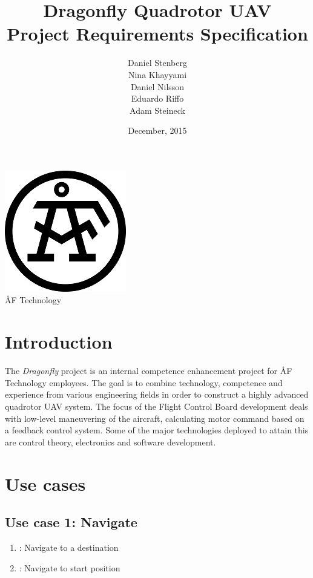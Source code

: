 \documentclass[a4paper]{article}
\title{Dragonfly Quadrotor UAV \\ Project Requirements Specification}
\author{Daniel Stenberg \\ Nina Khayyami \\ Daniel Nilsson \\ Eduardo Riffo \\ Adam Steineck}
\date{December, 2015}         		%
\makeatletter
\newcommand{\labitem}[2]{%
\def\@itemlabel{\textbf{#2}}
\item
\def\@currentlabel{#2}\label{#1}}
\makeatother
\begin{document}

\maketitle                      		%

\begin{center}
\vspace{64pt}
\includegraphics[scale=1.6]{images/AF_Logotype20141_Black.png}
\vspace{16pt}
\\ \large ÅF Technology
\end{center}

\newpage

\tableofcontents				%

\newpage

\section{Introduction}

The \emph{Dragonfly} project is an internal competence enhancement project for ÅF Technology employees. The goal is to combine technology, competence and experience from various engineering fields in order to construct a highly advanced quadrotor UAV system. The focus of the Flight Control Board development deals with low-level maneuvering of the aircraft, calculating motor command based on a feedback control system. Some of the major technologies deployed to attain this are control theory, electronics and software development.

\section{Use cases}

\subsection{Use case 1: Navigate}
\label{uc:navigate}
\begin{enumerate}
	\labitem{req:nav.1}{Navigate.1}: Navigate to a destination
	\labitem{req:nav.2}{Navigate.2}: Navigate to start position
\end{enumerate}
\end{document}
